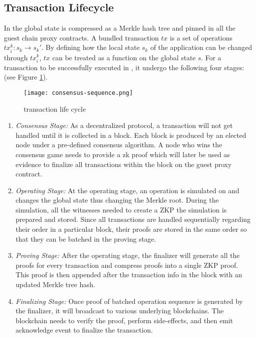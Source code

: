 \subsection{Transaction Lifecycle}
In \dprotocol the global state is compressed as a Merkle hash tree and pinned in all the guest chain proxy contracts. A bundled transaction $tx$ is a set of operations $tx_i^k: s_k \rightarrow s_k'$. By defining how the local state $s_k$ of the application can be changed through $tx_i^k$, $tx$ can be treated as a function on the global state $s$. For a transaction to be successfully executed in \dprotocol, it undergo the following four stages: (see Figure \ref{transaction-fifecycle}).
\begin{figure}[!ht]
\texttt{[image: consensus-sequence.png]}
\caption{transaction life cycle}
\label{transaction-fifecycle}
\end{figure}
\begin{enumerate}[leftmargin=*]
\item \emph{Consensus Stage:} As a decentralized protocol, a transaction will not get handled until it is collected in a block. Each block is produced by an elected node under a pre-defined consensus algorithm. A node who wins the consensus game needs to provide a zk proof which will later be used as evidence to finalize all transactions within the block on the guest proxy contract.

\item \emph{Operating Stage:} At the operating stage, an operation is simulated on \dprotocol and changes the global state thus changing the Merkle root. During the simulation, all the witnesses needed to create a ZKP the simulation is prepared and stored. Since all transactions are handled sequentially regarding their order in a particular block, their proofs are stored in the same order so that they can be batched in the proving stage. 

\item \emph{Proving Stage:} After the operating stage, the finalizer will generate all the proofs for every transaction and compress proofs into a single ZKP proof. This proof is then appended after the transaction info in the block with an updated Merkle tree hash. 
\item \emph{Finalizing Stage:} Once proof of batched operation sequence is generated by the finalizer, it will broadcast to various underlying blockchains. The blockchain needs to verify the proof, perform side-effects, and then emit acknowledge event to finalize the transaction.
\end{enumerate}

